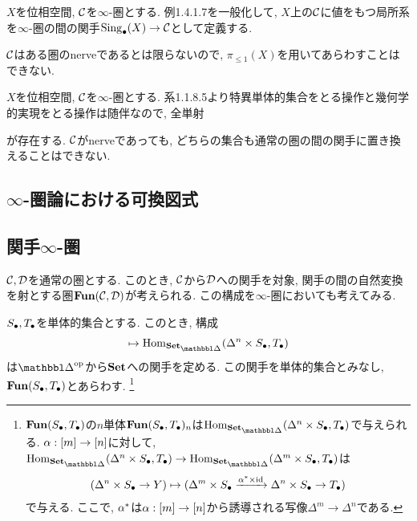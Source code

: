 \documentclass[uplatex, a4paper, 14Q, dvipdfmx]{jsreport}
\begin{document}
\begin{remark}
  $X$を位相空間, $\mathcal{C}$を$\infty$-圏とする. 
  例1.4.1.7を一般化して, $X$上の$\mathcal{C}$に値をもつ局所系を$\infty$-圏の間の関手$\mathrm{Sing}_\bullet(X) \to \mathcal{C}$として定義する. 
  \begin{center}
  \end{center}
  $\mathcal{C}$はある圏のnerveであるとは限らないので, $\pi_{\leq 1}(X)$を用いてあらわすことはできない. 
\end{remark}

\begin{example}
  $X$を位相空間, $\mathcal{C}$を$\infty$-圏とする. 
  系1.1.8.5より特異単体的集合をとる操作と幾何学的実現をとる操作は随伴なので, 全単射
  \begin{center}
  \end{center}
  が存在する. 
  $\mathcal{C}$がnerveであっても, どちらの集合も通常の圏の間の関手に置き換えることはできない.
\end{example}

\subsection{\texorpdfstring{$\infty$}{infty}-圏論における可換図式}

\subsection{関手\texorpdfstring{$\infty$}{infty}-圏}

$\mathcal{C},\mathcal{D}$を通常の圏とする.
このとき, $\mathcal{C}$から$\mathcal{D}$への関手を対象, 関手の間の自然変換を射とする圏$\mathbf{Fun}(\mathcal{C},\mathcal{D})$が考えられる. 
この構成を$\infty$-圏においても考えてみる. 

\begin{cons}
  $S_\bullet,T_\bullet$を単体的集合とする. 
  このとき, 構成 
  \begin{align*}
    [n] \mt \Hom_{\sset}(\Delta^n \ti \S,\T)
  \end{align*}
  は$\simop$から$\mathbf{Set}$への関手を定める. 
  この関手を単体的集合とみなし, $\mathbf{Fun}(S_\bullet,T_\bullet)$とあらわす. 
  \footnote{
    $\mathbf{Fun}(S_\bullet,T_\bullet)$の$n$単体$\mathbf{Fun}(S_\bullet,T_\bullet)_n$は$\Hom_{\sset}(\Delta^n \ti \S,\T)$で与えられる. 
    $\alpha: [m] \to [n]$に対して, $\Hom_{\sset}(\Delta^n \ti \S,\T) \to \Hom_{\sset}(\Delta^m \ti \S,\T)$は
    \begin{align*}
      (\Delta^n \times S_\bullet \to Y) \mapsto (\Delta^m \times S_\bullet \xrightarrow{\alpha^* \times \mathrm{id}} \Delta^n \times S_\bullet \to T_\bullet)
    \end{align*}
    で与える. 
    ここで, $\alpha^*$は$\alpha: [m] \to [n]$から誘導される写像$\Delta^m \to \Delta^n$である. 
  }
\end{cons}
\end{document}
